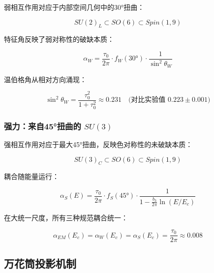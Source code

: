 弱相互作用对应于内部空间几何中的30°扭曲：

\begin{equation}
    SU(2)_L \subset SO(6) \subset Spin(1,9)
\end{equation}

特征角反映了弱对称性的破缺本质：

\begin{equation}
    \alpha_W = \frac{\tau_0}{2\pi} \cdot f_W(30°) \cdot \frac{1}{\sin^2\theta_W}
\end{equation}

温伯格角从相对方向涌现：

\begin{equation}
    \sin^2\theta_W = \frac{\tau_0^2}{1 + \tau_0^2} \approx 0.231
\quad \text{(对比实验值 } 0.223 \pm 0.001\text{)}
\end{equation}

\subsubsection{强力：来自45°扭曲的 $SU(3)$}

强相互作用对应于最大45°扭曲，反映色对称性的未破缺本质：

\begin{equation}
    SU(3)_C \subset SO(6) \subset Spin(1,9)
\end{equation}

耦合随能量运行：

\begin{equation}
    \alpha_S(E) = \frac{\tau_0}{2\pi} \cdot f_S(45°) \cdot \frac{1}{1 - \frac{b_3}{2\pi}\ln(E/E_c)}
\end{equation}

在大统一尺度，所有三种规范耦合统一：

\begin{equation}
    \alpha_{EM}(E_c) = \alpha_W(E_c) = \alpha_S(E_c) = \frac{\tau_0}{2\pi} \approx 0.008
\end{equation}

\subsection{万花筒投影机制}

